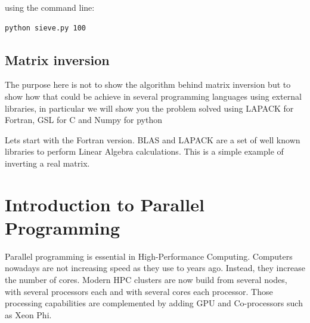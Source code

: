 using the command line:

\begin{lstlisting}
python sieve.py 100
\end{lstlisting}

\subsection{Matrix inversion}

The purpose here is not to show the algorithm behind matrix inversion but to show how that could be achieve in several programming languages using external libraries, in particular we will show you the problem solved using LAPACK for Fortran, GSL for C and Numpy for python

Lets start with the Fortran version. BLAS and LAPACK are a set of well known libraries to perform Linear Algebra calculations. This is a simple example of inverting a real matrix.










% 
% 
% 
% 
% 


\section{Introduction to Parallel Programming}

Parallel programming is essential in High-Performance Computing. Computers nowadays are not increasing speed as they use to years ago.
Instead, they increase the number of cores.
Modern HPC clusters are now build from several nodes, with several processors each and with several cores each processor.
Those processing capabilities are complemented by adding GPU and Co-processors such as Xeon Phi.

